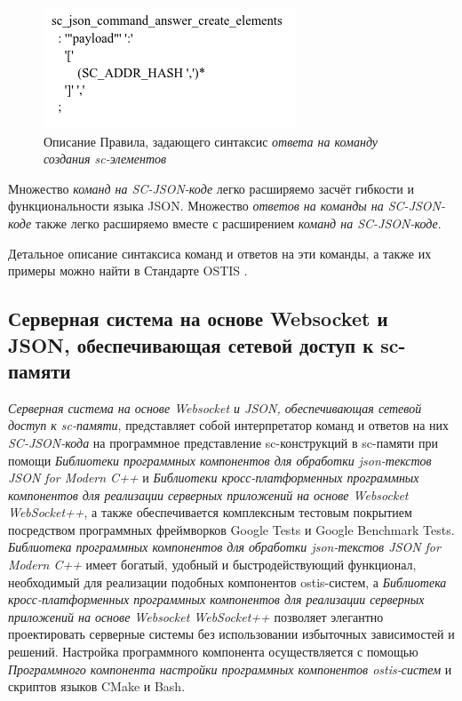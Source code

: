 \begin{figure}[htbp]
	\center
	\includegraphics[scale=0.8]{author/part6/figures/create_elements_command_answer.png}
	\caption{Описание Правила, задающего синтаксис \textit{ответа на команду создания sc-элементов}}
	\label{fig:create_elements_command_answer}
\end{figure}

Множество \textit{команд на SC-JSON-коде} легко расширяемо засчёт гибкости и функциональности языка JSON. Множество \textit{ответов на команды на SC-JSON-коде} также легко расширяемо вместе с расширением \textit{команд на SC-JSON-коде}.

Детальное описание синтаксиса команд и ответов на эти команды, а также их примеры можно найти в Стандарте OSTIS \cite{Standard2021}.

\subsection{Серверная система на основе Websocket и JSON, обеспечивающая сетевой доступ к sc-памяти}
\label{sec_soft_platform_sc_server}

\textit{Серверная система на основе Websocket и JSON, обеспечивающая сетевой доступ к sc-памяти}, представляет собой интерпретатор команд и ответов на них \textit{SC-JSON-кода} на программное представление sc-конструкций в sc-памяти при помощи \textit{Библиотеки программных компонентов для обработки json-текстов JSON for Modern C++} и \textit{Библиотеки кросс-платформенных программных компонентов для реализации серверных приложений на основе Websocket WebSocket++}, а также обеспечивается комплексным тестовым покрытием посредством программных фреймворков Google Tests и Google Benchmark Tests. \textit{Библиотека программных компонентов для обработки json-текстов JSON for Modern C++} имеет богатый, удобный и быстродействующий функционал, необходимый для реализации подобных компонентов ostis-систем, а \textit{Библиотека кросс-платформенных программных компонентов для реализации серверных приложений на основе Websocket WebSocket++} позволяет элегантно проектировать серверные системы без использовании избыточных зависимостей и решений. Настройка программного компонента осуществляется с помощью \textit{Программного компонента настройки программных компонентов ostis-систем} и скриптов языков CMake и Bash.

